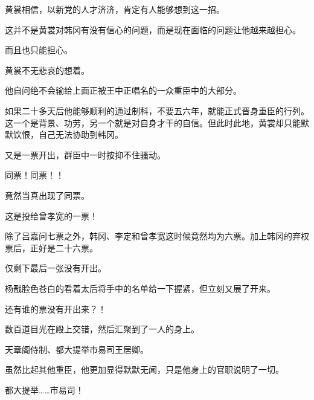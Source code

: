 黄裳相信，以新党的人才济济，肯定有人能够想到这一招。

这并不是黄裳对韩冈有没有信心的问题，而是现在面临的问题让他越来越担心。

而且也只能担心。

黄裳不无悲哀的想着。

他自问绝不会输给上面正被王中正唱名的一众重臣中的大部分。

如果二十多天后他能够顺利的通过制科，不要五六年，就能正式晋身重臣的行列。这一个是背景、功劳，另一个就是对自身才干的自信。但此时此地，黄裳却只能默默饮恨，自己无法协助到韩冈。

又是一票开出，群臣中一时按抑不住骚动。

同票！同票！！

竟然当真出现了同票。

这是投给曾孝宽的一票！

除了吕嘉问七票之外，韩冈、李定和曾孝宽这时候竟然均为六票。加上韩冈的弃权票后，正好是二十六票。

仅剩下最后一张没有开出。

杨戬脸色苍白的看着太后将手中的名单给一下握紧，但立刻又展了开来。

还有谁的票没有开出来？！

数百道目光在殿上交错，然后汇聚到了一人的身上。

天章阁侍制、都大提举市易司王居卿。

虽然比起其他重臣，他更加显得默默无闻，只是他身上的官职说明了一切。

都大提举……市易司！


